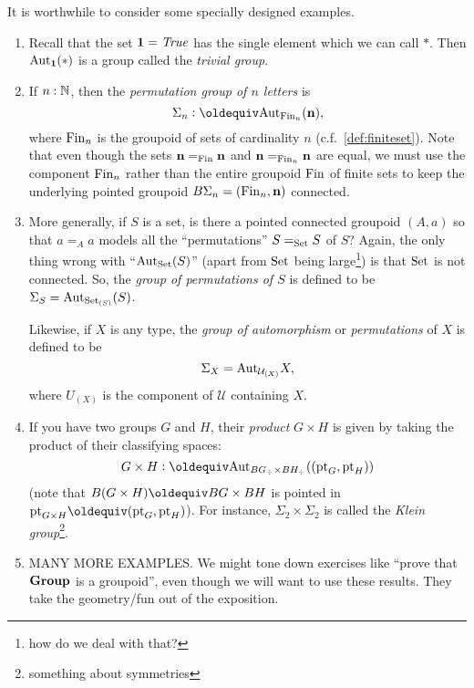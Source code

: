 \begin{example}\label{ex:groups}
  It is worthwhile to consider some specially designed examples.
  \begin{enumerate}
  \item Recall that the set $\mathbf 1=\mathop{\mathit{True}}$ has the single element which we can call $*$. Then $\mathrm{Aut}_{\mathbf 1}(*)$ is a group called the \emph{trivial group}.
  \item If $n:\mathbb{N}$, then the \emph{permutation group of $n$ letters} is 
$$\Sigma_n\defequi\aut_{\fin_n}(\mathbf n),$$ 
where $\mathrm{Fin}_n$ is the groupoid of sets of cardinality $n$ (c.f.~\ref{def:finiteset}).  Note that even though the sets $\mathbf n=_{\mathrm{Fin}}\mathbf n$ and $\mathbf n=_{\mathrm{Fin}_n}\mathbf n$ are equal, we must use the component $\mathrm{Fin}_n$ rather than the entire groupoid $\mathrm{Fin}$ of finite sets to keep the underlying pointed groupoid $B\Sigma_n=(\mathrm{Fin}_n,\mathbf n)$ connected.
  \item More generally, if $S$ is a set, is there a pointed connected groupoid $(A,a)$ so that $a=_Aa$ models all the ``permutations'' $S=_{\mathord{\mathrm{Set}}}S$ of $S$?  Again, the only thing wrong with ``$\mathrm{Aut}_{\mathord{\mathrm{Set}}}(S)$'' (apart from $\mathord{\mathrm{Set}}$ being large\footnote{how do we deal with that?}) is that $\mathord{\mathrm{Set}}$ is not connected. 
%
 So, 
the \emph{group of permutations of $S$} is defined to be $\Sigma_{S}=\mathrm{Aut}_{\mathord{\mathrm{Set}}_{(S)}}(S)$.  

Likewise, if $X$ is any type, the \emph{group of automorphism} or \emph{permutations} of $X$ is defined to be 
$$\Sigma_X=\mathrm{Aut}_{\mathcal U_{(X)}}X,$$
 where $U_{(X)}$ is the component of $\mathcal U$ containing $X$.
\item If you have two groups $G$ and $H$, their {\em product} $G\times H$ is given by taking the product of their classifying spaces:
$$G\times H\defequi\aut_{BG_\div\times BH_\div}((\pt_G,\pt_H))$$
(note that $B(G\times H)\oldequiv BG\times BH$ is pointed in $\pt_{G\times H}\oldequiv(\pt_G,\pt_H)$).  
For instance, $\Sigma_2\times\Sigma_2$ is called the {\em Klein group}\footnote{something about symmetries}.
\item MANY MORE EXAMPLES.  We might tone down exercises like ``prove that $\mathbf{Group}$ is a groupoid'', even though we will want to use these results.  They take the geometry/fun out of the exposition.
  \end{enumerate}
\end{example}
